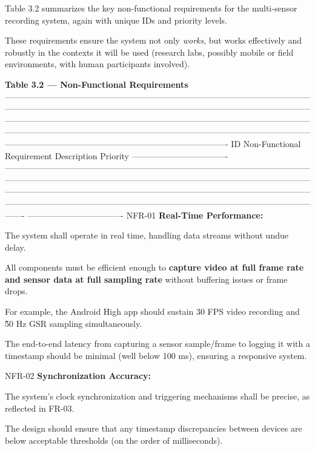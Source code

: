 Table 3.2 summarizes the key non-functional requirements for the multi-sensor recording system, again with unique IDs and priority levels.

These requirements ensure the system not only \textit{works}, but works effectively and robustly in the contexts it will be used (research labs, possibly mobile or field environments, with human participants involved).

\textbf{Table 3.2 --- Non-Functional Requirements}
 ------------------------------------------------------------------------------------------------------------------------------------------------------------------------------------------------------------------------------------------------------------------------------------------------------------------------------------------------------------------------------------------------------------------------------------------------------------------------------------------------------------------------------- ID Non-Functional Requirement Description Priority ---------------------------------- ------------------------------------------------------------------------------------------------------------------------------------------------------------------------------------------------------------------------------------------------------------------------------------------------------------------------------------------------------------------------------------------------------------------------------------------------------- ---------------------------------- NFR-01 \textbf{Real-Time Performance:}

The system shall operate in real time, handling data streams without undue delay.

All components must be efficient enough to \textbf{capture video at full frame rate and sensor data at full sampling rate}
 without buffering issues or frame drops.

For example, the Android High app should sustain 30 FPS video recording and \~50 Hz GSR sampling simultaneously.

The end-to-end latency from capturing a sensor sample/frame to logging it with a timestamp should be minimal (well below 100 ms), ensuring a responsive system.

NFR-02 \textbf{Synchronization Accuracy:}

The system's clock synchronization and triggering mechanisms shall be precise, as reflected in FR-03.

The design should ensure that any timestamp discrepancies between devices are below acceptable thresholds (on the order of milliseconds).

